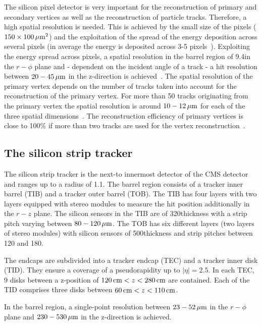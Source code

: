 The silicon pixel detector is very important for the reconstruction of primary and secondary vertices as well as the reconstruction of particle tracks.
Therefore, a high spatial resolution is needed.
This is achieved by the small size of the pixels ($ 150 \times 100 \,\mu\text{m}^2$) and the exploitation of the spread of the energy deposition across several pixels (in average the energy is deposited across 3-5 pixels~\cite{bib:TWIKI:PixelClusterSize}).
Exploiting the energy spread across pixels, a spatial resolution in the barrel region of 9.4\mum in the $r - \phi$ plane and - dependent on the incident angle of a track - a hit resolution between $20-45\,\mu\text{m}$ in the z-direction is achieved~\cite{bib:CMS:tracking_8TeV}. 
The spatial resolution of the primary vertex depends on the number of tracks taken into account for the reconstruction of the primary vertex.
For more than 50 tracks originating from the primary vertex the spatial resolution is around $10-12\,\mu\text{m}$ for each of the three spatial dimensions~\cite{bib:CMS:tracking_8TeV}.
The reconstruction efficiency of primary vertices is close to 100\% if more than two tracks are used for the vertex reconstruction~\cite{bib:CMS:tracking_8TeV}.

\subsection*{The silicon strip tracker}
The silicon strip tracker is the next-to innermost detector of the CMS detector and ranges up to a radius of 1.1\m.
The barrel region consists of a tracker inner barrel (TIB) and a tracker outer barrel (TOB).
The TIB has four layers with two layers equipped with stereo modules to measure the hit position additionally in the $r-z$ plane.
The silicon sensors in the TIB are of 320\mum thickness with a strip pitch varying between $80-120\,\mu\text{m}$.
The TOB has six different layers (two layers of stereo modules) with silicon sensors of 500\mum thickness and strip pitches between 120 and 180\mum. 

The endcaps are subdivided into a tracker endcap (TEC) and a tracker inner disk (TID).
They ensure a coverage of a pseudorapidity up to $|\eta|=2.5$.
In each TEC, 9 disks between a z-position of $120\,\text{cm} < z < 280\,\text{cm}$ are contained.
Each of the TID comprises three disks between $60\,\text{cm} < z < 110\,\text{cm}$.

In the barrel region, a single-point resolution between $23 - 52\,\mu\text{m}$ in the $r-\phi$ plane and $230 - 530\,\mu\text{m}$  in the z-direction is achieved.

